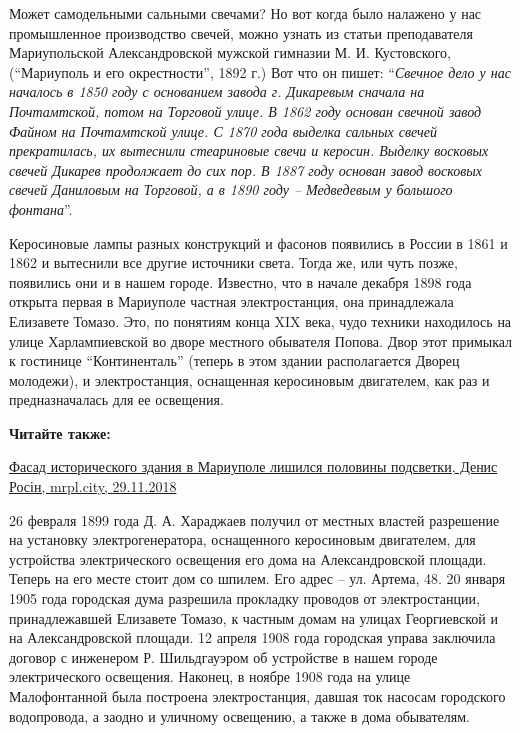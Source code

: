 
Может самодельными сальными свечами? Но вот когда было налажено у нас
промышленное производство свечей, можно узнать из статьи преподавателя
Мариупольской Александровской мужской гимназии М. И. Кустовского, (\enquote{Мариуполь и
его окрестности}, 1892 г.) Вот что он пишет: \enquote{\em Свечное дело у нас началось в
1850 году с основанием завода г. Дикаревым сначала на Почтамтской, потом на
Торговой улице. В 1862 году основан свечной завод Файном на Почтамтской улице.
С 1870 года выделка сальных свечей прекратилась, их вытеснили стеариновые свечи
и керосин. Выделку восковых свечей Дикарев продолжает до сих пор. В 1887 году
основан завод восковых свечей Даниловым на Торговой, а в 1890 году – Медведевым
у большого фонтана}.

Керосиновые лампы разных конструкций и фасонов появились в России в 1861 и
1862 и вытеснили все другие источники света. Тогда же, или чуть позже,
появились они и в нашем городе. Известно, что в начале декабря 1898 года
открыта первая в Мариуполе частная электростанция, она принадлежала Елизавете
Томазо. Это, по понятиям конца XΙX века, чудо техники находилось на улице
Харлампиевской во дворе местного обывателя Попова. Двор этот примыкал к
гостинице \enquote{Континенталь} (теперь в этом здании располагается Дворец молодежи),
и электростанция, оснащенная керосиновым двигателем, как раз и предназначалась
для ее освещения.

\textbf{Читайте также:} 

\href{https://mrpl.city/news/view/fasad-istoricheskogo-zdaniya-v-mariupole-lishilsya-poloviny-podsvetki-fotofakt}{%
Фасад исторического здания в Мариуполе лишился половины подсветки, Денис Росін, mrpl.city, 29.11.2018}

26 февраля 1899 года Д. А. Хараджаев получил от местных властей разрешение на
установку электрогенератора, оснащенного керосиновым двигателем, для устройства
электрического освещения его дома на Александровской площади. Теперь на его
месте стоит дом со шпилем. Его адрес – ул. Артема, 48. 20 января 1905 года
городская дума разрешила прокладку проводов от электростанции, принадлежавшей
Елизавете Томазо, к частным домам на улицах Георгиевской и на Александровской
площади. 12 апреля 1908 года городская управа заключила договор с инженером Р.
Шильдгауэром об устройстве в нашем городе электрического освещения. Наконец, в
ноябре 1908 года на улице Малофонтанной была построена электростанция, давшая
ток насосам городского водопровода, а заодно и уличному освещению, а также в
дома обывателям.

